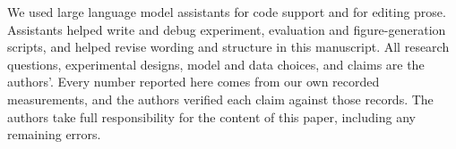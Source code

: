 We used large language model assistants for code support and for editing prose. Assistants helped write and debug experiment, evaluation and figure-generation scripts, and helped revise wording and structure in this manuscript. All research questions, experimental designs, model and data choices, and claims are the authors'. Every number reported here comes from our own recorded measurements, and the authors verified each claim against those records. The authors take full responsibility for the content of this paper, including any remaining errors.
